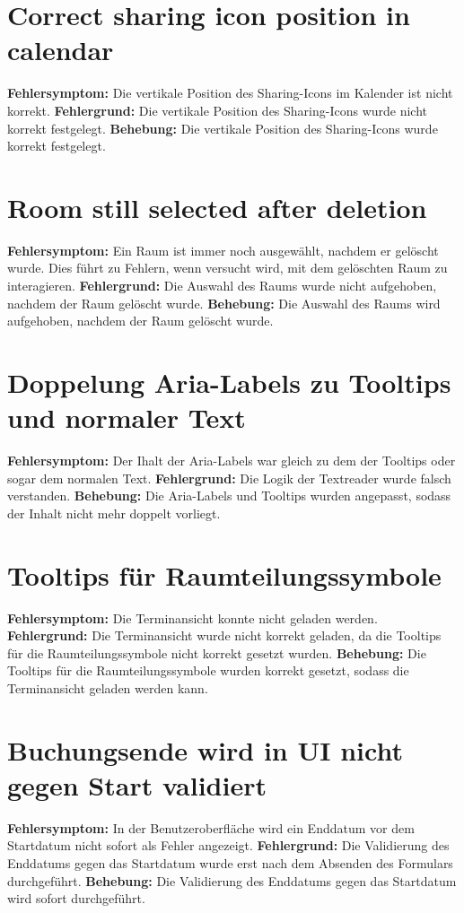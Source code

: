 \section{Correct sharing icon position in calendar}
\textbf{Fehlersymptom:} Die vertikale Position des Sharing-Icons im Kalender ist nicht korrekt.
\textbf{Fehlergrund:} Die vertikale Position des Sharing-Icons wurde nicht korrekt festgelegt.
\textbf{Behebung:} Die vertikale Position des Sharing-Icons wurde korrekt festgelegt.

\section{Room still selected after deletion}
\textbf{Fehlersymptom:} Ein Raum ist immer noch ausgewählt, nachdem er gelöscht wurde. Dies führt zu Fehlern, wenn versucht wird, mit dem gelöschten Raum zu interagieren.
\textbf{Fehlergrund:} Die Auswahl des Raums wurde nicht aufgehoben, nachdem der Raum gelöscht wurde.
\textbf{Behebung:} Die Auswahl des Raums wird aufgehoben, nachdem der Raum gelöscht wurde.

\section{Doppelung Aria-Labels zu Tooltips und normaler Text}
\textbf{Fehlersymptom:} Der Ihalt der Aria-Labels war gleich zu dem der Tooltips oder sogar dem normalen Text.
\textbf{Fehlergrund:} Die Logik der Textreader wurde falsch verstanden.
\textbf{Behebung:} Die Aria-Labels und Tooltips wurden angepasst, sodass der Inhalt nicht mehr doppelt vorliegt.

\section{Tooltips für Raumteilungssymbole}
\textbf{Fehlersymptom: } Die Terminansicht konnte nicht geladen werden.
\textbf{Fehlergrund: } Die Terminansicht wurde nicht korrekt geladen, da die Tooltips für die Raumteilungssymbole nicht korrekt gesetzt wurden.
\textbf{Behebung: } Die Tooltips für die Raumteilungssymbole wurden korrekt gesetzt, sodass die Terminansicht geladen werden kann.

\section{Buchungsende wird in UI nicht gegen Start validiert}
\textbf{Fehlersymptom:} In der Benutzeroberfläche wird ein Enddatum vor dem Startdatum nicht sofort als Fehler angezeigt.
\textbf{Fehlergrund:} Die Validierung des Enddatums gegen das Startdatum wurde erst nach dem Absenden des Formulars durchgeführt.
\textbf{Behebung:} Die Validierung des Enddatums gegen das Startdatum wird sofort durchgeführt.

